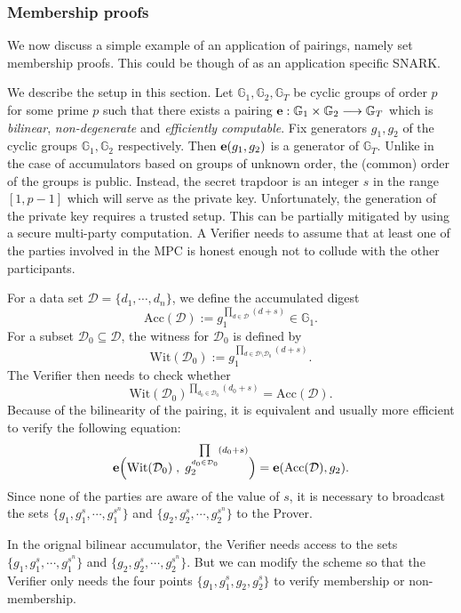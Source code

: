 \documentclass[11pt, lettersize, notitlepage, leqno, footskip=0.6cm]{article}
\newcommand{\lra}{\longrightarrow}
\newcommand{\mc}{\mathcal}
\newcommand{\mb}{\mathbb}
\newcommand{\mr}{\mathrm}
\newcommand{\sub}{\subseteq}
\newcommand{\vs}{\vspace{-0.15cm}}
\numberwithin{equation}{section}
\begin{document}
\subsubsection{\fontsize{11}{11}\selectfont Membership proofs}


We now discuss a simple example of an application of pairings, namely set membership proofs. This could be though of as an application specific SNARK.

We describe the setup in this section. Let $\mb{G}_1, \mb{G}_2, \mb{G}_T$ be cyclic groups of order $p$ for some prime $p$ such that there exists a pairing ${\bf{e}}:\mb{G}_1\times \mb{G}_2\lra \mb{G}_T$ which is \textit{bilinear}, \textit{non-degenerate} and \textit{efficiently computable}. Fix generators $g_1, g_2$ of the cyclic groups $\mb{G}_1, \mb{G}_2$ respectively. Then ${\bf{e}}(g_1,g_2)$ is a generator of $\mb{G}_T$. Unlike in the case of accumulators based on groups of unknown order, the (common) order of the groups is public. Instead, the secret trapdoor is an integer $s$ in the range $[1, p-1]$ which will serve as the private key. Unfortunately, the generation of the private key requires a trusted setup. This can be partially mitigated by using a secure multi-party computation. A Verifier needs to assume that at least one of the parties involved in the MPC is honest enough not to collude with the other participants. 

For a data set $\mc{D} = \{d_1,\cdots, d_n\}$, we define the accumulated digest \vs $$\mr{Acc}(\mc{D}):= g_1^{\prod\limits_{d\in \mc{D}} (d+s)} \in \mb{G}_1.$$ For a subset $\mc{D}_0\sub \mc{D}$, the witness for $\mc{D}_0$ is defined by $$\mr{Wit}(\mc{D}_0) := g_1^{\prod\limits_{d\in \mc{D}\setminus \mc{D}_0} (d+s)}.$$ The Verifier then needs to check whether $$\mr{Wit}(\mc{D}_0)^{\prod\limits_{d_0\in \mc{D}_0} (d_0+s)} = \mr{Acc}(\mc{D}).$$ Because of the bilinearity of the pairing, it is equivalent and usually more efficient to verify the following equation: \vs $${\bf{e}}\Big(\mr{Wit}(\mc{D}_0)\;,\; g_2^{\prod\limits_{d_0\in \mc{D}_0} (d_0+s)}\Big) = {\bf{e}}(\mr{Acc}(\mc{D}), g_2).$$ Since none of the parties are aware of the value of $s$, it is necessary to broadcast the sets $\{g_1, g_1^s,\cdots , g_1^{s^n}\}$ and $\{g_2, g_2^s,\cdots , g_2^{s^n}\}$ to the Prover.

In the orignal bilinear accumulator, the Verifier needs access to the sets $\{g_1, g_1^s,\cdots , g_1^{s^n}\}$ and $\{g_2, g_2^s,\cdots , g_2^{s^n}\}$. But we can modify the scheme so that the Verifier only needs the four points $\{g_1,g_1^s, g_2, g_2^s \}$ to verify membership or non-membership.
\end{document}
